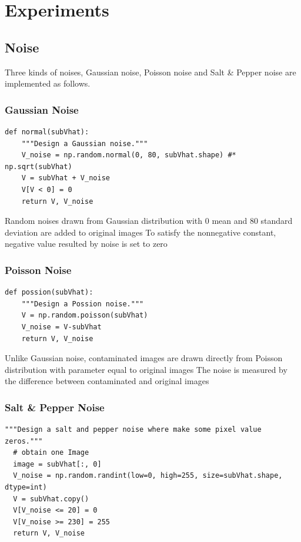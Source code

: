 \section{Experiments}\label{chapter4}

\subsection{Noise}
Three kinds of noises, Gaussian noise, Poisson noise and Salt \& Pepper noise are implemented as follows.
\subsubsection{Gaussian Noise}
\begin{lstlisting}[caption= Gaussian Noise Design, label=matn1]
def normal(subVhat):
    """Design a Gaussian noise."""
    V_noise = np.random.normal(0, 80, subVhat.shape) #* np.sqrt(subVhat)
    V = subVhat + V_noise
    V[V < 0] = 0
    return V, V_noise
\end{lstlisting}

Random noises drawn from Gaussian distribution with 0 mean and 80 standard deviation are added to original images
To satisfy the nonnegative constant, negative value resulted by noise is set to zero

\subsubsection{Poisson Noise}
\begin{lstlisting}[caption= Poisson Noise Design, label=matn1]
def possion(subVhat):
    """Design a Possion noise."""
    V = np.random.poisson(subVhat)
    V_noise = V-subVhat
    return V, V_noise
\end{lstlisting}

Unlike Gaussian noise, contaminated images are drawn directly from Poisson distribution with parameter equal to original images
The noise is measured by the difference between contaminated and original images

\subsubsection{Salt \& Pepper Noise}
\begin{lstlisting}[caption= Salt \& Pepper Noise Design, label=matn1]
"""Design a salt and pepper noise where make some pixel value zeros."""
  # obtain one Image
  image = subVhat[:, 0]
  V_noise = np.random.randint(low=0, high=255, size=subVhat.shape, dtype=int)
  V = subVhat.copy()
  V[V_noise <= 20] = 0
  V[V_noise >= 230] = 255
  return V, V_noise
\end{lstlisting}

